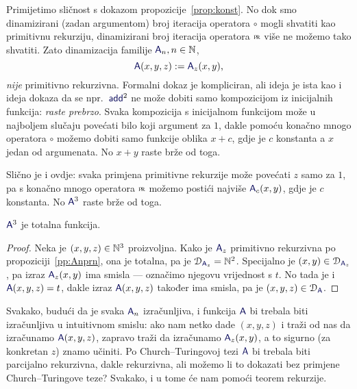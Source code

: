 Primijetimo sličnost s dokazom propozicije~\ref{prop:konst}. No dok smo dinamizirani (zadan argumentom) broj iteracija operatora $\circ$ mogli shvatiti kao primitivnu rekurziju, dinamizirani broj iteracija operatora $\pr$ više ne možemo tako shvatiti. Zato dinamizacija familije $\f A_n,n\in\N$,
\begin{equation}
    \f A(x,y,z):=\f A_z(x,y)\text,
\end{equation}
\emph{nije} primitivno rekurzivna. Formalni dokaz je kompliciran, ali ideja je ista kao i ideja dokaza da se npr.\ $\f{add}^2$ ne može dobiti samo kompozicijom iz inicijalnih funkcija: \emph{raste prebrzo}. Svaka kompozicija s inicijalnom funkcijom može u najboljem slučaju povećati bilo koji argument za $1$, dakle pomoću konačno mnogo operatora $\circ$ možemo dobiti samo funkcije oblika $x+c$, gdje je $c$ konstanta a $x$ jedan od argumenata. No $x+y$ raste brže od toga.

Slično je i ovdje: svaka primjena primitivne rekurzije može povećati $z$ samo za $1$, pa s konačno mnogo operatora $\pr$ možemo postići najviše $\f A_c(x,y)$, gdje je $c$ konstanta. No $\f A^3$ raste brže od toga.

\begin{korolar}\label{kor:A3tot}
$\f A^3$ je totalna funkcija.
\end{korolar}
\begin{proof}
Neka je $(x,y,z)\in{\mathbb N}^3$ proizvoljna. Kako je $\f A_z$ primitivno rekurzivna po propoziciji~\ref{pp:Anprn}, ona je totalna, pa je $\dom{\f A_z}=\N^2$. Specijalno je $(x,y)\in\dom{\f A_z}$, pa izraz $\f A_z(x,y)$ ima smisla --- označimo njegovu vrijednost s $t$. No tada je i $\f A(x,y,z)=t$, dakle izraz $\f A(x,y,z)$ također ima smisla, pa je $(x,y,z)\in\dom{\f A}$.
\end{proof}

Svakako, budući da je svaka $\f A_n$ izračunljiva, i funkcija $\f A$ bi trebala biti izračunljiva u intuitivnom smislu: ako nam netko dade $(x,y,z)$ i traži od nas da izračunamo $\f A(x,y,z)$, zapravo traži da izračunamo $\f A_z(x,y)$, a to sigurno (za konkretan $z$) znamo učiniti. Po Church--\!Turingovoj tezi $\f A$ bi trebala biti parcijalno rekurzivna, dakle rekurzivna, ali možemo li to dokazati bez primjene Church--\!Turingove teze? Svakako, i u tome će nam pomoći teorem rekurzije.

